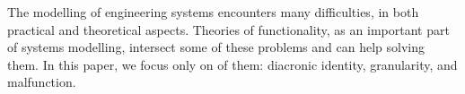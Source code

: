 \documentclass[
]{ceurart}
\begin{document}
The modelling of engineering systems encounters many difficulties, in both practical and theoretical aspects. 
Theories of functionality, as an important part of systems modelling, intersect some of these problems and can help solving them. In this paper, we focus only on  of them: diacronic identity, granularity, and malfunction.
\end{document}
